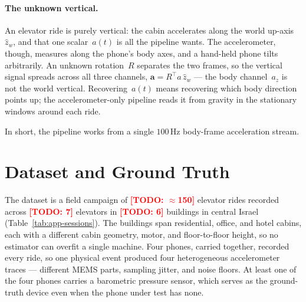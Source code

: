 \documentclass[manuscript,review,screen]{acmart}
\newcommand{\todo}[1]{\textcolor{red}{\textbf{[TODO: #1]}}}
\begin{document}
\paragraph{The unknown vertical.}
An elevator ride is purely vertical: the cabin accelerates along the
world up-axis~$\hat z_w$, and that one scalar~$a(t)$ is all the
pipeline wants.  The accelerometer, though, measures along the
phone's body axes, and a hand-held phone tilts arbitrarily.  An
unknown rotation~$R$ separates the two frames, so the vertical
signal spreads across all three channels,
$\mathbf{a}=R^{\!\top}\!a\,\hat z_w$ --- the body channel~$a_z$ is
not the world vertical.  Recovering~$a(t)$ means recovering which
body direction points up; the accelerometer-only pipeline reads it
from gravity in the stationary windows around each ride.

In short, the pipeline works from a single $100$\,Hz body-frame
acceleration stream.

\section{Dataset and Ground Truth}
\label{sec:dataset}

The dataset is a field campaign of \todo{$\approx$150} elevator
rides recorded across \todo{7} elevators in \todo{6} buildings in
central Israel (Table~\ref{tab:app-sessions}).  The buildings span
residential, office, and hotel cabins, each with a different cabin
geometry, motor, and floor-to-floor height, so no estimator can
overfit a single machine.  Four phones, carried together, recorded
every ride, so one physical event produced four heterogeneous
accelerometer traces --- different MEMS parts, sampling jitter, and
noise floors.  At least one of the four phones carries a barometric
pressure sensor, which serves as the ground-truth device even when
the phone under test has none.
\end{document}
